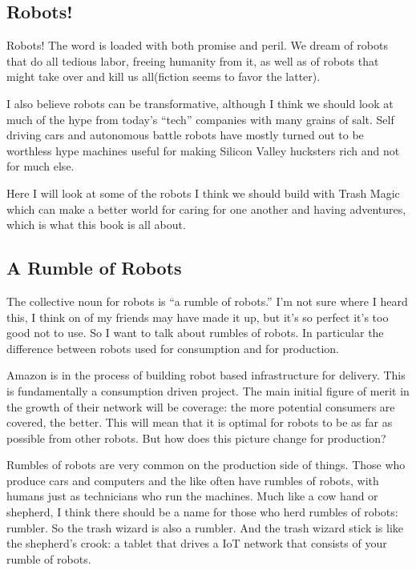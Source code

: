 \subsection{Robots!}\label{robots}

Robots! The word is loaded with both promise and peril. We dream of
robots that do all tedious labor, freeing humanity from it, as well as
of robots that might take over and kill us all(fiction seems to favor
the latter).

I also believe robots can be transformative, although I think we should
look at much of the hype from today's ``tech'' companies with many
grains of salt. Self driving cars and autonomous battle robots have
mostly turned out to be worthless hype machines useful for making
Silicon Valley hucksters rich and not for much else.

Here I will look at some of the robots I think we should build with
Trash Magic which can make a better world for caring for one another and
having adventures, which is what this book is all about.

\subsection{A Rumble of Robots}\label{a-rumble-of-robots}

The collective noun for robots is ``a rumble of robots.'' I'm not sure
where I heard this, I think on of my friends may have made it up, but
it's so perfect it's too good not to use. So I want to talk about
rumbles of robots. In particular the difference between robots used for
consumption and for production.

Amazon is in the process of building robot based infrastructure for
delivery. This is fundamentally a consumption driven project. The main
initial figure of merit in the growth of their network will be coverage:
the more potential consumers are covered, the better. This will mean
that it is optimal for robots to be as far as possible from other
robots. But how does this picture change for production?

Rumbles of robots are very common on the production side of things.
Those who produce cars and computers and the like often have rumbles of
robots, with humans just as technicians who run the machines. Much like
a cow hand or shepherd, I think there should be a name for those who
herd rumbles of robots: rumbler. So the trash wizard is also a rumbler.
And the trash wizard stick is like the shepherd's crook: a tablet that
drives a IoT network that consists of your rumble of robots.

